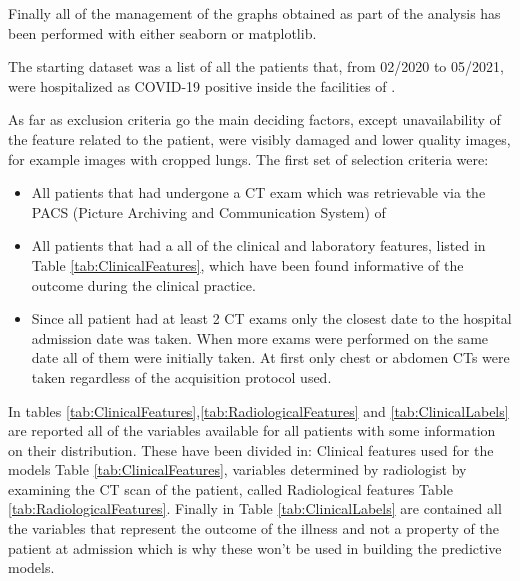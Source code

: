 Finally all of the management of the graphs obtained as part of the analysis has been performed with either seaborn\cite{seaborn} or matplotlib\cite{matplotlib}.


The starting dataset was a list of all the patients that, from 02/2020 to 05/2021, were hospitalized as COVID-19 positive inside the facilities of \orsola. 

As far as exclusion criteria go the main deciding factors, except unavailability of the feature related to the patient, were visibly damaged and lower quality images, for example images with cropped lungs. The first set of selection criteria were:

\begin{itemize}
\item All patients that had undergone a CT exam which was retrievable via the PACS (Picture Archiving and Communication System) of \orsola
\item All patients that had a all of the clinical and laboratory features, listed in Table \ref{tab:ClinicalFeatures}, which have been found informative of the outcome during the clinical practice.
\item Since all patient had at least 2 CT exams only the closest date to the hospital admission date was taken. When more exams were performed on the same date all of them were initially taken. At first only chest or abdomen CTs were taken regardless of the acquisition protocol used.
\end{itemize}

In tables \ref{tab:ClinicalFeatures},\ref{tab:RadiologicalFeatures} and \ref{tab:ClinicalLabels} are reported all of the variables available for all patients with some information on their distribution.
These have been divided in: Clinical features used for the models Table \ref{tab:ClinicalFeatures}, variables determined by radiologist by examining the CT scan of the patient, called Radiological features Table \ref{tab:RadiologicalFeatures}.
Finally in Table \ref{tab:ClinicalLabels} are contained all the variables that represent the outcome of the illness and not a property of the patient at admission which is why these won't be used in building the predictive models.

